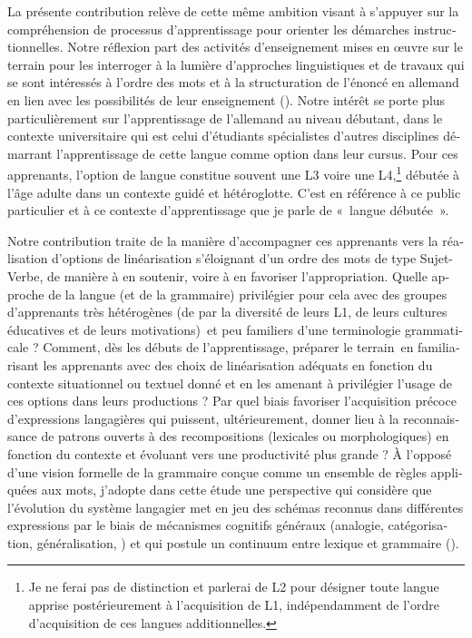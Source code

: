 \documentclass[output=paper]{langscibook}
\begin{document}
\begin{otherlanguage}{french}
La présente contribution relève de cette même ambition visant à s’appuyer sur la compréhension de processus d’apprentissage pour orienter les démarches instructionnelles. Notre réflexion part des activités d’enseignement mises en œuvre sur le terrain pour les interroger à la lumière d’approches linguistiques et de travaux qui se sont intéressés à l’ordre des mots et à la structuration de l’énoncé en allemand en lien avec les possibilités de leur enseignement (\citealt{Pienemann1999, DiehlEtAl2000, Winkler2017}). Notre intérêt se porte plus particulièrement sur l’apprentissage de l’allemand au niveau débutant, dans le contexte universitaire qui est celui d’étudiants spécialistes d’autres disciplines démarrant l’apprentissage de cette langue comme option dans leur cursus. Pour ces apprenants, l’option de langue constitue souvent une L3 voire une L4,\footnote{Je ne ferai pas de distinction et parlerai de L2 pour désigner toute langue apprise postérieurement à l’acquisition de L1, indépendamment de l’ordre d’acquisition de ces langues additionnelles.} débutée à l’âge adulte dans un contexte guidé et hétéroglotte. C’est en référence à ce public particulier et à ce contexte d’apprentissage que je parle de «~langue débutée~».

Notre contribution traite de la manière d’accompagner ces apprenants vers la réalisation d’options de linéarisation s’éloignant d’un ordre des mots de type Sujet-Verbe, de manière à en soutenir, voire à en favoriser l’appropriation. Quelle approche de la langue (et de la grammaire) privilégier pour cela avec des groupes d’apprenants très hétérogènes (de par la diversité de leurs L1, de leurs cultures éducatives et de leurs motivations)~et peu familiers d’une terminologie grammaticale ? Comment, dès les débuts de l’apprentissage, préparer le terrain~en familiarisant les apprenants avec des choix de linéarisation adéquats en fonction du contexte situationnel ou textuel donné et en les amenant à privilégier l’usage de ces options dans leurs productions ? Par quel biais favoriser l’acquisition précoce d’expressions langagières qui puissent, ultérieurement, donner lieu à la reconnaissance de patrons ouverts à des recompositions (lexicales ou morphologiques) en fonction du contexte et évoluant vers une productivité plus grande ? À l’opposé d’une vision formelle de la grammaire conçue comme un ensemble de règles appliquées aux mots, j'adopte dans cette étude une perspective qui considère que l’évolution du système langagier met en jeu des schémas reconnus dans différentes expressions par le biais de mécanismes cognitifs généraux (analogie, catégorisation, généralisation, \citealt{Diessel2007}) et qui postule un continuum entre lexique et grammaire (\citealt[90–95]{ZiemLasch2013}).


\end{otherlanguage}
\end{document}
